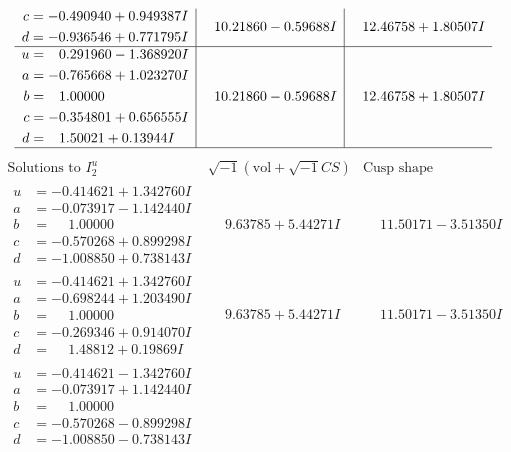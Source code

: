 \documentclass[1p]{elsarticle_modified}
\theoremstyle{definition}
\newcommand{\I}{\sqrt{-1}}
\begin{document}
$$\begin{array}{c|c|c}
\begin{aligned}
c &= -0.490940 + 0.949387 I \\
d &= -0.936546 + 0.771795 I\end{aligned}
 & \phantom{-}10.21860 - 0.59688 I & \phantom{-}12.46758 + 1.80507 I \\ \hline\begin{aligned}
u &= \phantom{-}0.291960 - 1.368920 I \\
a &= -0.765668 + 1.023270 I \\
b &= \phantom{-}1.00000\phantom{ +0.000000I} \\
c &= -0.354801 + 0.656555 I \\
d &= \phantom{-}1.50021 + 0.13944 I\end{aligned}
 & \phantom{-}10.21860 - 0.59688 I & \phantom{-}12.46758 + 1.80507 I\\
 \hline 
 \end{array}$$\newpage$$\begin{array}{c|c|c}  
\text{Solutions to }I^u_{2}& \I (\text{vol} + \sqrt{-1}CS) & \text{Cusp shape}\\
 \hline 
\begin{aligned}
u &= -0.414621 + 1.342760 I \\
a &= -0.073917 - 1.142440 I \\
b &= \phantom{-}1.00000\phantom{ +0.000000I} \\
c &= -0.570268 + 0.899298 I \\
d &= -1.008850 + 0.738143 I\end{aligned}
 & \phantom{-}9.63785 + 5.44271 I & \phantom{-}11.50171 - 3.51350 I \\ \hline\begin{aligned}
u &= -0.414621 + 1.342760 I \\
a &= -0.698244 + 1.203490 I \\
b &= \phantom{-}1.00000\phantom{ +0.000000I} \\
c &= -0.269346 + 0.914070 I \\
d &= \phantom{-}1.48812 + 0.19869 I\end{aligned}
 & \phantom{-}9.63785 + 5.44271 I & \phantom{-}11.50171 - 3.51350 I \\ \hline\begin{aligned}
u &= -0.414621 - 1.342760 I \\
a &= -0.073917 + 1.142440 I \\
b &= \phantom{-}1.00000\phantom{ +0.000000I} \\
c &= -0.570268 - 0.899298 I \\
d &= -1.008850 - 0.738143 I\end{aligned}

\end{array}$$
\end{document}
